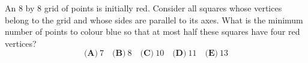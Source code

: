 An $8$ by $8$ grid of points is initially red. Consider all squares whose vertices belong to the grid and whose sides are parallel to its axes. What is the minimum number of points to colour blue so that at most half these squares have four red vertices?
\[\textbf{(A)}~7\quad\textbf{(B)}~8\quad\textbf{(C)}~10\quad\textbf{(D)}~11\quad\textbf{(E)}~13\]
